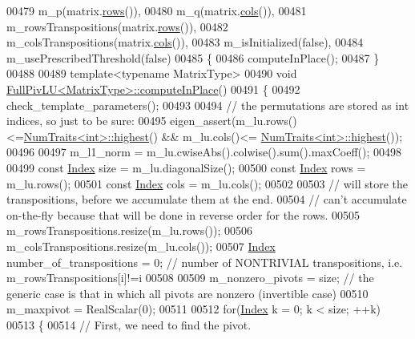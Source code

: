 \begin{DoxyCode}
00479     m\_p(matrix.\hyperlink{group___core___module_a8141320ba8df384426c298b32b000d8e}{rows}()),
00480     m\_q(matrix.\hyperlink{group___core___module_a7b0b45c7351847696c911ce8aa2abbdb}{cols}()),
00481     m\_rowsTranspositions(matrix.\hyperlink{group___core___module_a8141320ba8df384426c298b32b000d8e}{rows}()),
00482     m\_colsTranspositions(matrix.\hyperlink{group___core___module_a7b0b45c7351847696c911ce8aa2abbdb}{cols}()),
00483     m\_isInitialized(\textcolor{keyword}{false}),
00484     m\_usePrescribedThreshold(\textcolor{keyword}{false})
00485 \{
00486   computeInPlace();
00487 \}
00488 
00489 \textcolor{keyword}{template}<\textcolor{keyword}{typename} MatrixType>
00490 \textcolor{keywordtype}{void} \hyperlink{group___l_u___module_class_eigen_1_1_full_piv_l_u}{FullPivLU<MatrixType>::computeInPlace}()
00491 \{
00492   check\_template\_parameters();
00493 
00494   \textcolor{comment}{// the permutations are stored as int indices, so just to be sure:}
00495   eigen\_assert(m\_lu.rows()<=\hyperlink{group___core___module_struct_eigen_1_1_num_traits}{NumTraits<int>::highest}() && m\_lu.cols()<=
      \hyperlink{group___core___module_struct_eigen_1_1_num_traits}{NumTraits<int>::highest}());
00496 
00497   m\_l1\_norm = m\_lu.cwiseAbs().colwise().sum().maxCoeff();
00498 
00499   \textcolor{keyword}{const} \hyperlink{group___core___module_a554f30542cc2316add4b1ea0a492ff02}{Index} size = m\_lu.diagonalSize();
00500   \textcolor{keyword}{const} \hyperlink{group___core___module_a554f30542cc2316add4b1ea0a492ff02}{Index} rows = m\_lu.rows();
00501   \textcolor{keyword}{const} \hyperlink{group___core___module_a554f30542cc2316add4b1ea0a492ff02}{Index} cols = m\_lu.cols();
00502 
00503   \textcolor{comment}{// will store the transpositions, before we accumulate them at the end.}
00504   \textcolor{comment}{// can't accumulate on-the-fly because that will be done in reverse order for the rows.}
00505   m\_rowsTranspositions.resize(m\_lu.rows());
00506   m\_colsTranspositions.resize(m\_lu.cols());
00507   \hyperlink{group___core___module_a554f30542cc2316add4b1ea0a492ff02}{Index} number\_of\_transpositions = 0; \textcolor{comment}{// number of NONTRIVIAL transpositions, i.e.
       m\_rowsTranspositions[i]!=i}
00508 
00509   m\_nonzero\_pivots = size; \textcolor{comment}{// the generic case is that in which all pivots are nonzero (invertible case)}
00510   m\_maxpivot = RealScalar(0);
00511 
00512   \textcolor{keywordflow}{for}(\hyperlink{group___core___module_a554f30542cc2316add4b1ea0a492ff02}{Index} k = 0; k < size; ++k)
00513   \{
00514     \textcolor{comment}{// First, we need to find the pivot.}

\end{DoxyCode}
